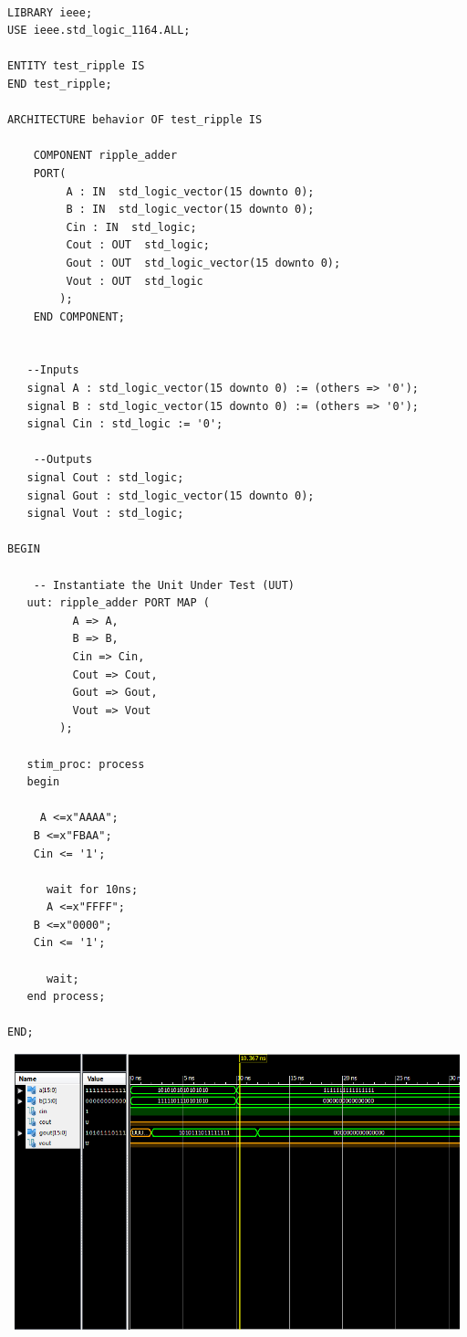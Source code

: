 \documentclass{article}
\begin{document}
\begin{lstlisting}

LIBRARY ieee;
USE ieee.std_logic_1164.ALL;

ENTITY test_ripple IS
END test_ripple;
 
ARCHITECTURE behavior OF test_ripple IS 
 
    COMPONENT ripple_adder
    PORT(
         A : IN  std_logic_vector(15 downto 0);
         B : IN  std_logic_vector(15 downto 0);
         Cin : IN  std_logic;
         Cout : OUT  std_logic;
         Gout : OUT  std_logic_vector(15 downto 0);
         Vout : OUT  std_logic
        );
    END COMPONENT;
    

   --Inputs
   signal A : std_logic_vector(15 downto 0) := (others => '0');
   signal B : std_logic_vector(15 downto 0) := (others => '0');
   signal Cin : std_logic := '0';

 	--Outputs
   signal Cout : std_logic;
   signal Gout : std_logic_vector(15 downto 0);
   signal Vout : std_logic;

BEGIN
 
	-- Instantiate the Unit Under Test (UUT)
   uut: ripple_adder PORT MAP (
          A => A,
          B => B,
          Cin => Cin,
          Cout => Cout,
          Gout => Gout,
          Vout => Vout
        );

   stim_proc: process
   begin		
	
	 A <=x"AAAA";
    B <=x"FBAA";
    Cin <= '1';
     
	  wait for 10ns;
	  A <=x"FFFF";
    B <=x"0000";
    Cin <= '1';
	  
      wait;
   end process;

END;
\end{lstlisting}
\includegraphics[width=16cm, height=8cm]{test_ripple.png}
\pagebreak
\end{document}
